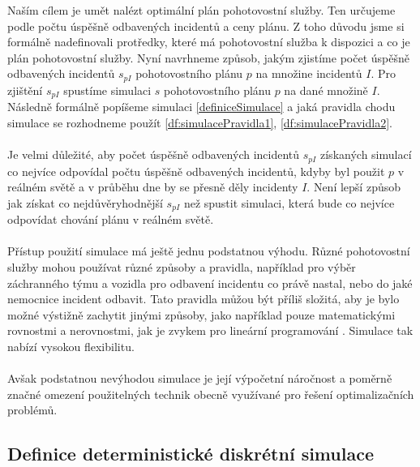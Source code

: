 Naším cílem je umět nalézt optimální plán pohotovostní služby.
Ten určujeme podle počtu úspěšně odbavených incidentů a ceny plánu.
Z toho důvodu jsme si formálně nadefinovali protředky, které má pohotovostní služba k dispozici a co je plán pohotovostní služby.
Nyní navrhneme způsob, jakým zjistíme počet úspěšně odbavených incidentů $s_{pI}$ pohotovostního plánu $p$ na množine incidentů $I$.
Pro zjištění $s_{pI}$ spustíme simulaci $s$ pohotovostního plánu $p$ na dané množině $I$.
Následně formálně popíšeme simulaci \ref{definiceSimulace} a jaká pravidla chodu simulace se rozhodneme použít  \ref{df:simulacePravidla1}, \ref{df:simulacePravidla2}.
\\
\\
Je velmi důležité, aby počet úspěšně odbavených incidentů $s_{pI}$ získaných simulací co nejvíce odpovídal počtu úspěšně odbavených incidentů,
kdyby byl použit $p$ v reálném světě a v průběhu dne by se přesně děly incidenty $I$.
Není lepší způsob jak získat co nejdůvěryhodnější $s_{pI}$ než spustit simulaci, která bude co nejvíce odpovídat chování plánu v reálném světě.
\\
\\
Přístup použití simulace má ještě jednu podstatnou výhodu.
Různé pohotovostní služby mohou používat různé způsoby a pravidla, například pro výběr záchranného týmu a vozidla pro odbavení incidentu co právě nastal, nebo do jaké nemocnice incident odbavit.
Tato pravidla můžou být příliš složitá, aby je bylo možné výstižně zachytit jinými způsoby, jako například pouze matematickými rovnostmi a nerovnostmi, jak je zvykem pro lineární programování \cite{LP}.
Simulace tak nabízí vysokou flexibilitu.
\\
\\
Avšak podstatnou nevýhodou simulace je její výpočetní náročnost a poměrně značné omezení použitelných technik obecně využívané pro řešení optimalizačních problémů.

\subsection{Definice deterministické diskrétní simulace}


